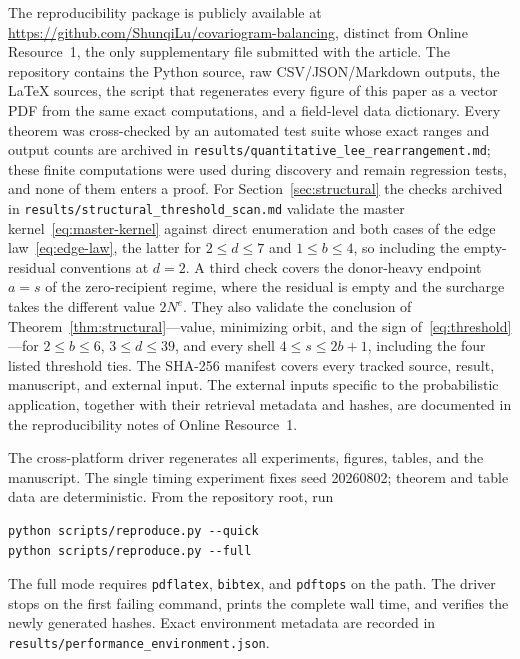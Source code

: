 \documentclass[pdflatex,sn-mathphys-num]{sn-jnl}
\theoremstyle{thmstyleone}
\theoremstyle{thmstylethree}
\theoremstyle{thmstyletwo}
\begin{document}
\begin{appendices}
The reproducibility package is publicly available at
\url{https://github.com/ShunqiLu/covariogram-balancing}, distinct from Online
Resource~1, the only supplementary file submitted with the article.  The
repository contains the Python source, raw CSV/JSON/Markdown
outputs, the LaTeX sources, the script that regenerates every figure of this
paper as a vector PDF from the same exact computations,
and a field-level data dictionary.  Every theorem was cross-checked by an
automated test suite whose exact ranges and output counts are archived in
\texttt{results/quantitative\_lee\_rearrangement.md}; these finite
computations were used during discovery and remain regression tests, and none
of them enters a proof.
For Section~\ref{sec:structural} the checks archived in
\texttt{results/structural\_threshold\_scan.md} validate the master
kernel~\eqref{eq:master-kernel} against direct enumeration and both cases of
the edge law~\eqref{eq:edge-law}, the latter for $2\le d\le7$ and
$1\le b\le4$, so including the empty-residual conventions at $d=2$.  A third
check covers the donor-heavy endpoint $a=s$ of the zero-recipient regime,
where the residual is empty and the surcharge takes the different value
$2N^e$.  They also validate the conclusion of
Theorem~\ref{thm:structural}---value, minimizing orbit, and the sign
of~\eqref{eq:threshold}---for $2\le b\le6$, $3\le d\le39$, and every shell
$4\le s\le2b+1$, including the four listed threshold ties.
The SHA-256 manifest covers every tracked source, result, manuscript, and
external input.  The external inputs specific to the probabilistic
application, together with their retrieval metadata and hashes, are
documented in the reproducibility notes of Online Resource~1.

The cross-platform driver regenerates all experiments, figures, tables, and
the manuscript.  The single timing experiment fixes seed 20260802; theorem and
table data are deterministic.  From the repository root, run
\begin{verbatim}
python scripts/reproduce.py --quick
python scripts/reproduce.py --full
\end{verbatim}
The full mode requires \texttt{pdflatex}, \texttt{bibtex}, and
\texttt{pdftops} on the path.  The
driver stops on the first failing command, prints the complete wall time, and
verifies the newly generated hashes.  Exact environment metadata are recorded
in \texttt{results/performance\_environment.json}.



\end{appendices}


\end{document}
